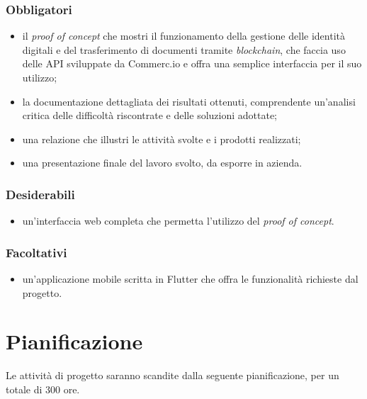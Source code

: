 \subsubsection*{Obbligatori}
\begin{itemize}
	\item il \textit{proof of concept} che mostri il funzionamento della gestione delle identità digitali e del trasferimento di documenti tramite \textit{blockchain}, che faccia uso delle API sviluppate da Commerc.io e offra una semplice interfaccia per il suo utilizzo;
	\item la documentazione dettagliata dei risultati ottenuti, comprendente un'analisi critica delle difficoltà riscontrate e delle soluzioni adottate;
	\item una relazione che illustri le attività svolte e i prodotti realizzati;
	\item una presentazione finale del lavoro svolto, da esporre in azienda.
\end{itemize}

\subsubsection*{Desiderabili}
\begin{itemize}
	\item un'interfaccia web completa che permetta l'utilizzo del \textit{proof of concept}.
\end{itemize}

\subsubsection*{Facoltativi}
\begin{itemize}
	\item un'applicazione mobile scritta in Flutter che offra le funzionalità richieste dal progetto.
\end{itemize} 


\section{Pianificazione}

Le attività di progetto saranno scandite dalla seguente pianificazione, per un totale di 300 ore.

